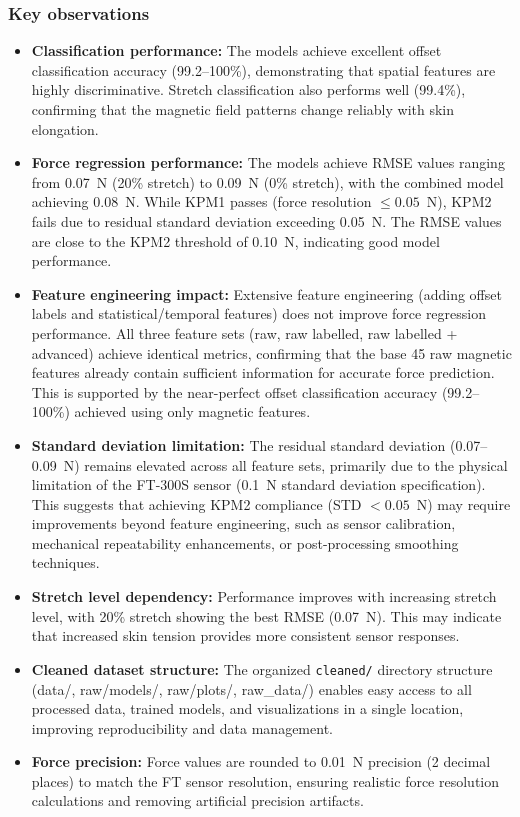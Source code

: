 \documentclass[11pt,a4paper]{article}
\begin{document}
\subsubsection{Key observations}
\begin{itemize}[leftmargin=1.5em]
    \item \textbf{Classification performance:} The models achieve excellent offset classification accuracy (99.2--100\%), demonstrating that spatial features are highly discriminative. Stretch classification also performs well (99.4\%), confirming that the magnetic field patterns change reliably with skin elongation.
    \item \textbf{Force regression performance:} The models achieve RMSE values ranging from 0.07~N (20\% stretch) to 0.09~N (0\% stretch), with the combined model achieving 0.08~N. While KPM1 passes (force resolution \(\leq 0.05\)~N), KPM2 fails due to residual standard deviation exceeding 0.05~N. The RMSE values are close to the KPM2 threshold of 0.10~N, indicating good model performance.
    \item \textbf{Feature engineering impact:} Extensive feature engineering (adding offset labels and statistical/temporal features) does not improve force regression performance. All three feature sets (raw, raw labelled, raw labelled + advanced) achieve identical metrics, confirming that the base 45 raw magnetic features already contain sufficient information for accurate force prediction. This is supported by the near-perfect offset classification accuracy (99.2--100\%) achieved using only magnetic features.
    \item \textbf{Standard deviation limitation:} The residual standard deviation (0.07--0.09~N) remains elevated across all feature sets, primarily due to the physical limitation of the FT-300S sensor (0.1~N standard deviation specification). This suggests that achieving KPM2 compliance (STD $< 0.05$~N) may require improvements beyond feature engineering, such as sensor calibration, mechanical repeatability enhancements, or post-processing smoothing techniques.
    \item \textbf{Stretch level dependency:} Performance improves with increasing stretch level, with 20\% stretch showing the best RMSE (0.07~N). This may indicate that increased skin tension provides more consistent sensor responses.
    \item \textbf{Cleaned dataset structure:} The organized \texttt{cleaned/} directory structure (data/, raw/models/, raw/plots/, raw\_data/) enables easy access to all processed data, trained models, and visualizations in a single location, improving reproducibility and data management.
    \item \textbf{Force precision:} Force values are rounded to 0.01~N precision (2 decimal places) to match the FT sensor resolution, ensuring realistic force resolution calculations and removing artificial precision artifacts.
\end{itemize}
\end{document}
